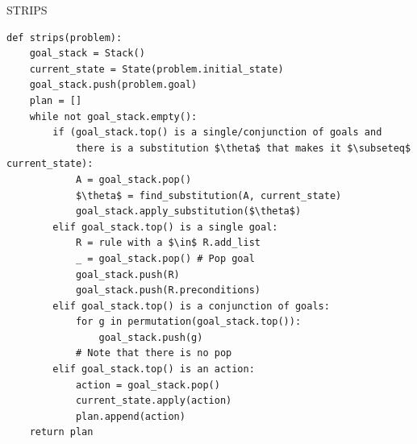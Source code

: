 \begin{algorithm}
\caption{STRIPS}
\begin{lstlisting}[mathescape=true]
def strips(problem):
    goal_stack = Stack()
    current_state = State(problem.initial_state)
    goal_stack.push(problem.goal)
    plan = []
    while not goal_stack.empty():
        if (goal_stack.top() is a single/conjunction of goals and
            there is a substitution $\theta$ that makes it $\subseteq$ current_state):
            A = goal_stack.pop()
            $\theta$ = find_substitution(A, current_state)
            goal_stack.apply_substitution($\theta$)
        elif goal_stack.top() is a single goal:
            R = rule with a $\in$ R.add_list
            _ = goal_stack.pop() # Pop goal
            goal_stack.push(R)
            goal_stack.push(R.preconditions)
        elif goal_stack.top() is a conjunction of goals:
            for g in permutation(goal_stack.top()):
                goal_stack.push(g)
            # Note that there is no pop
        elif goal_stack.top() is an action:
            action = goal_stack.pop()
            current_state.apply(action)
            plan.append(action)
    return plan
\end{lstlisting}
\end{algorithm}

